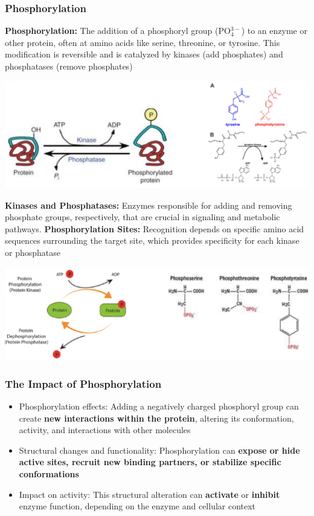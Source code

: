 \documentclass[10pt]{article}
\begin{document}
\subsubsection*{Phosphorylation}
\textbf{Phosphorylation:} The addition of a phosphoryl group (PO$_4^{3-}$) to an enzyme or other protein, often at amino acids like serine, threonine, or tyrosine.  This modification is reversible and is catalyzed by kinases (add phosphates) and phosphatases (remove phosphates)
\begin{center}
    \includegraphics*[width=\textwidth]{L1_11.png}
\end{center}
\textbf{Kinases and Phosphatases:} Enzymes responsible for adding and removing phosphate groups, respectively, that are crucial in signaling and metabolic pathways.
\textbf{Phosphorylation Sites:} Recognition depends on specific amino acid sequences surrounding the target site, which provides specificity for each kinase or phosphatase
\begin{center} 
	\includegraphics*[width=\textwidth]{L1_12.png}
\end{center}

\subsubsection*{The Impact of Phosphorylation}
\begin{itemize}
	\item Phosphorylation effects: Adding a negatively charged phosphoryl group can create \textbf{new interactions within the protein}, altering its conformation, activity, and interactions with other molecules
	\item Structural changes and functionality: Phosphorylation can \textbf{expose or hide active sites, recruit new binding partners, or stabilize specific conformations}
	\item Impact on activity: This structural alteration can \textbf{activate} or \textbf{inhibit} enzyme function, depending on the enzyme and cellular context
\end{itemize}
\end{document}
